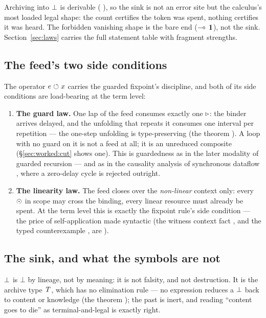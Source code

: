 \documentclass{eptcs}
\begin{document}
Archiving into $\bot$ is derivable (
), so the sink is not an error site but the
calculus's most loaded legal shape: the count certifies the token was
spent, nothing certifies it was heard. The forbidden vanishing shape is
the bare end ($\multimap\,\mathbf{1}$), not the sink. Section~\ref{sec:laws}
carries the full statement table with fragment strengths.

\subsection{The feed's two side conditions}\label{sec:core:feedback}

The operator $e \circlearrowleft x$ carries the guarded fixpoint's discipline,
and both of its side conditions are load-bearing at the term level:

\begin{enumerate}
\item \textbf{The guard law.} One lap of the feed consumes exactly one
$\triangleright$: the binder arrives delayed, and the unfolding that repeats it
consumes one interval per repetition --- the one-step unfolding is
type-preserving (the theorem 
). A loop with no guard on it is not a feed at
all; it is an unreduced composite (\S\ref{sec:worked:cut} shows one).
This is guardedness as in the later modality of guarded recursion
\cite{nakano2000,birkedal2012} --- and as in the causality analysis of
synchronous dataflow \cite{lustre1991}, where a zero-delay cycle is
rejected outright.
\item \textbf{The linearity law.} The feed closes over the
\emph{non-linear} context only: every $\odot$ in scope may cross the
binding, every linear resource must already be spent. At the term level
this is exactly the fixpoint rule's side condition --- the price of
self-application made syntactic (the witness context fact
, and the typed counterexample
, are ).
\end{enumerate}

\subsection{The sink, and what the symbols are not}\label{sec:core:sinks}

$\bot$ is $\bot$ by lineage, not by meaning: it is not falsity, and
not destruction. It is the archive type $\mathit{T}$, which has no elimination
rule --- no expression reduces a $\bot$ back to content or knowledge
(the theorem  ); the past
is inert, and reading ``content goes to die'' as terminal-and-legal is
exactly right.
\end{document}
